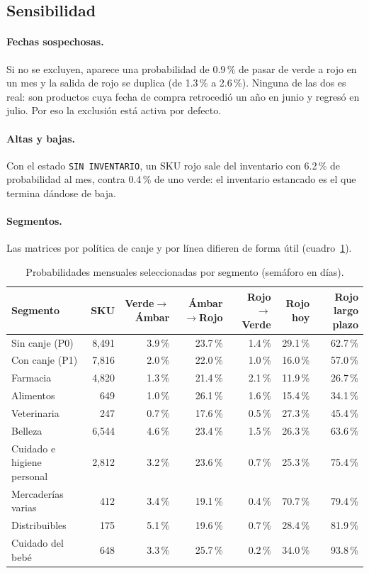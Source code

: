 \documentclass[11pt,letterpaper]{article}
\begin{document}
\subsection{Sensibilidad}
\label{sec:sensibilidad}

\paragraph{Fechas sospechosas.} Si no se excluyen, aparece una probabilidad de 0.9\,\% de pasar de verde a rojo en un mes y la salida de rojo se duplica (de 1.3\,\% a 2.6\,\%). Ninguna de las dos es real: son productos cuya fecha de compra retrocedió un año en junio y regresó en julio. Por eso la exclusión está activa por defecto.

\paragraph{Altas y bajas.} Con el estado \texttt{SIN INVENTARIO}, un SKU rojo sale del inventario con 6.2\,\% de probabilidad al mes, contra 0.4\,\% de uno verde: el inventario estancado es el que termina dándose de baja.

\paragraph{Segmentos.} Las matrices por política de canje y por línea difieren de forma útil (cuadro~\ref{tab:segmentos}).

\begin{table}[H]
\centering\footnotesize\setlength{\tabcolsep}{4pt}
\begin{tabular}{@{}l r r r r r r@{}}
\toprule
Segmento & SKU & Verde$\to$Ámbar & Ámbar$\to$Rojo & Rojo$\to$Verde & Rojo hoy & Rojo largo plazo \\
\midrule
Sin canje (P0) & 8,491 & 3.9\,\% & 23.7\,\% & 1.4\,\% & 29.1\,\% & 62.7\,\% \\
Con canje (P1) & 7,816 & 2.0\,\% & 22.0\,\% & 1.0\,\% & 16.0\,\% & 57.0\,\% \\
\midrule
Farmacia & 4,820 & 1.3\,\% & 21.4\,\% & 2.1\,\% & 11.9\,\% & 26.7\,\% \\
Alimentos & 649 & 1.0\,\% & 26.1\,\% & 1.6\,\% & 15.4\,\% & 34.1\,\% \\
Veterinaria & 247 & 0.7\,\% & 17.6\,\% & 0.5\,\% & 27.3\,\% & 45.4\,\% \\
Belleza & 6,544 & 4.6\,\% & 23.4\,\% & 1.5\,\% & 26.3\,\% & 63.6\,\% \\
Cuidado e higiene personal & 2,812 & 3.2\,\% & 23.6\,\% & 0.7\,\% & 25.3\,\% & 75.4\,\% \\
Mercaderías varias & 412 & 3.4\,\% & 19.1\,\% & 0.4\,\% & 70.7\,\% & 79.4\,\% \\
Distribuibles & 175 & 5.1\,\% & 19.6\,\% & 0.7\,\% & 28.4\,\% & 81.9\,\% \\
Cuidado del bebé & 648 & 3.3\,\% & 25.7\,\% & 0.2\,\% & 34.0\,\% & 93.8\,\% \\
\bottomrule
\end{tabular}
\caption{Probabilidades mensuales seleccionadas por segmento (semáforo en días).}
\label{tab:segmentos}
\end{table}
\end{document}
